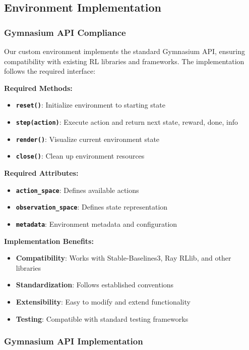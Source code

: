 \documentclass[12pt]{article}
\begin{document}
{{{\subsection{Environment Implementation}

\subsubsection{Gymnasium API Compliance}

Our custom environment implements the standard Gymnasium API, ensuring compatibility with existing RL libraries and frameworks. The implementation follows the required interface:

\textbf{Required Methods:}
\begin{itemize}
    \item \textbf{\texttt{reset()}}: Initialize environment to starting state
    \item \textbf{\texttt{step(action)}}: Execute action and return next state, reward, done, info
    \item \textbf{\texttt{render()}}: Visualize current environment state
    \item \textbf{\texttt{close()}}: Clean up environment resources
\end{itemize}

\textbf{Required Attributes:}
\begin{itemize}
    \item \textbf{\texttt{action\_space}}: Defines available actions
    \item \textbf{\texttt{observation\_space}}: Defines state representation
    \item \textbf{\texttt{metadata}}: Environment metadata and configuration
\end{itemize}

\textbf{Implementation Benefits:}
\begin{itemize}
    \item \textbf{Compatibility}: Works with Stable-Baselines3, Ray RLlib, and other libraries
    \item \textbf{Standardization}: Follows established conventions
    \item \textbf{Extensibility}: Easy to modify and extend functionality
    \item \textbf{Testing}: Compatible with standard testing frameworks
\end{itemize}

\subsubsection{Gymnasium API Implementation}

}}}
\end{document}
